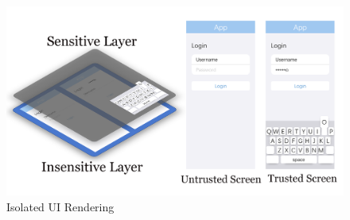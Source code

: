 \begin{figure}[t]
	\centering
	\includegraphics[width=\linewidth]{./Figs/isolated_ui.png}
	\caption{Isolated \ac{UI} Rendering}%
	\label{fig:isolated_ui}
\end{figure}
